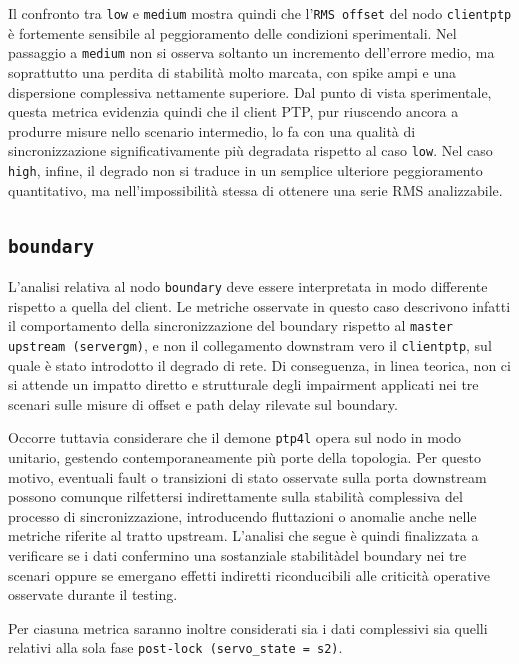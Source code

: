 Il confronto tra \texttt{low} e \texttt{medium} mostra quindi che l’\texttt{RMS
offset} del nodo \texttt{clientptp} è fortemente sensibile al peggioramento
delle condizioni sperimentali. Nel passaggio a \texttt{medium} non si osserva
soltanto un incremento dell’errore medio, ma soprattutto una perdita di stabilità
molto marcata, con spike ampi e una dispersione complessiva nettamente superiore.
Dal punto di vista sperimentale, questa metrica evidenzia quindi che il client
PTP, pur riuscendo ancora a produrre misure nello scenario intermedio, lo fa con
una qualità di sincronizzazione significativamente più degradata rispetto al
caso \texttt{low}. Nel caso \texttt{high}, infine, il degrado non si traduce in un
semplice ulteriore peggioramento quantitativo, ma nell’impossibilità stessa di
ottenere una serie RMS analizzabile.

\subsection{\texttt{boundary}}
L'analisi relativa al nodo \texttt{boundary} deve essere interpretata in modo differente
rispetto a quella del client. Le metriche osservate in questo caso descrivono
infatti il comportamento della sincronizzazione del boundary rispetto al \texttt{master
upstream (servergm)}, e non il collegamento downstram vero il \texttt{clientptp},
sul quale è stato introdotto il degrado di rete. Di conseguenza, in linea
teorica, non ci si attende un impatto diretto e strutturale degli impairment applicati
nei tre scenari sulle misure di offset e path delay rilevate sul boundary.

Occorre tuttavia considerare che il demone \texttt{ptp4l} opera sul nodo in modo
unitario, gestendo contemporaneamente più porte della topologia. Per questo
motivo, eventuali fault o transizioni di stato osservate sulla porta downstream possono
comunque rilfettersi indirettamente sulla stabilità complessiva del processo di sincronizzazione,
introducendo fluttazioni o anomalie anche nelle metriche riferite al tratto
upstream. L'analisi che segue è quindi finalizzata a verificare se i dati confermino
una sostanziale stabilitàdel boundary nei tre scenari oppure se emergano effetti indiretti
riconducibili alle criticità operative osservate durante il testing.

Per ciasuna metrica saranno inoltre considerati sia i dati complessivi sia quelli
relativi alla sola fase \texttt{post-lock (servo\_state = s2)}.

